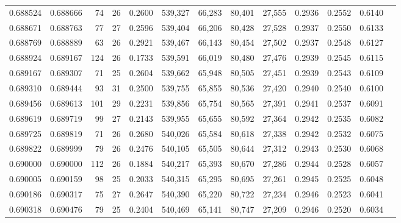 \begin{tabular}{rrrrrrrrrrrrr}
0.688524 & 0.688666 &     74 &    26 &                                     0.2600 & 539,327 &  66,283 &  80,401 &  27,555 & 0.2936 & 0.2552 & 0.6140 \\
0.688671 & 0.688763 &     77 &    27 &                                     0.2596 & 539,404 &  66,206 &  80,428 &  27,528 & 0.2937 & 0.2550 & 0.6133 \\
0.688769 & 0.688889 &     63 &    26 &                                     0.2921 & 539,467 &  66,143 &  80,454 &  27,502 & 0.2937 & 0.2548 & 0.6127 \\
0.688924 & 0.689167 &    124 &    26 &                                     0.1733 & 539,591 &  66,019 &  80,480 &  27,476 & 0.2939 & 0.2545 & 0.6115 \\
0.689167 & 0.689307 &     71 &    25 &                                     0.2604 & 539,662 &  65,948 &  80,505 &  27,451 & 0.2939 & 0.2543 & 0.6109 \\
0.689310 & 0.689444 &     93 &    31 &                                     0.2500 & 539,755 &  65,855 &  80,536 &  27,420 & 0.2940 & 0.2540 & 0.6100 \\
0.689456 & 0.689613 &    101 &    29 &                                     0.2231 & 539,856 &  65,754 &  80,565 &  27,391 & 0.2941 & 0.2537 & 0.6091 \\
0.689619 & 0.689719 &     99 &    27 &                                     0.2143 & 539,955 &  65,655 &  80,592 &  27,364 & 0.2942 & 0.2535 & 0.6082 \\
0.689725 & 0.689819 &     71 &    26 &                                     0.2680 & 540,026 &  65,584 &  80,618 &  27,338 & 0.2942 & 0.2532 & 0.6075 \\
0.689822 & 0.689999 &     79 &    26 &                                     0.2476 & 540,105 &  65,505 &  80,644 &  27,312 & 0.2943 & 0.2530 & 0.6068 \\
0.690000 & 0.690000 &    112 &    26 &                                     0.1884 & 540,217 &  65,393 &  80,670 &  27,286 & 0.2944 & 0.2528 & 0.6057 \\
0.690005 & 0.690159 &     98 &    25 &                                     0.2033 & 540,315 &  65,295 &  80,695 &  27,261 & 0.2945 & 0.2525 & 0.6048 \\
0.690186 & 0.690317 &     75 &    27 &                                     0.2647 & 540,390 &  65,220 &  80,722 &  27,234 & 0.2946 & 0.2523 & 0.6041 \\
0.690318 & 0.690476 &     79 &    25 &                                     0.2404 & 540,469 &  65,141 &  80,747 &  27,209 & 0.2946 & 0.2520 & 0.6034 \\

\end{tabular}
